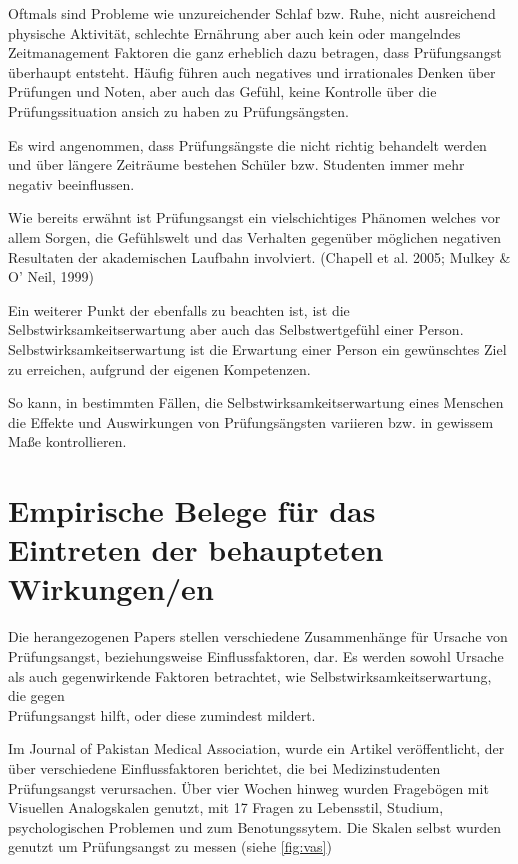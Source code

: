 \documentclass[11pt, a4paper]{article}
\begin{document}
Oftmals sind Probleme wie unzureichender Schlaf bzw. Ruhe, nicht ausreichend physische Aktivität, schlechte Ernährung aber auch kein oder mangelndes Zeitmanagement Faktoren die ganz erheblich dazu betragen, dass Prüfungsangst überhaupt entsteht. Häufig führen auch negatives und irrationales Denken über Prüfungen und Noten, aber auch das Gefühl, keine Kontrolle über die Prüfungssituation ansich zu haben zu Prüfungsängsten. \cite{hashmat2008factors}

Es wird angenommen, dass Prüfungsängste die nicht richtig behandelt werden und über längere Zeiträume bestehen Schüler bzw. Studenten immer mehr negativ beeinflussen. 

Wie bereits erwähnt ist Prüfungsangst ein vielschichtiges Phänomen welches vor allem Sorgen, die Gefühlswelt und das Verhalten gegenüber möglichen negativen Resultaten der akademischen Laufbahn involviert. (Chapell et al. 2005; Mulkey \& O’ Neil, 1999)

Ein weiterer Punkt der ebenfalls zu beachten ist, ist die Selbstwirksamkeitserwartung aber auch das Selbstwertgefühl einer Person. Selbstwirksamkeitserwartung ist die Erwartung einer Person ein gewünschtes Ziel zu erreichen, aufgrund der eigenen Kompetenzen.

So kann, in bestimmten Fällen, die Selbstwirksamkeitserwartung eines Menschen die Effekte und Auswirkungen von Prüfungsängsten variieren bzw. in gewissem Maße kontrollieren. \cite{barrows2013anxiety}

\newpage
\section*{Empirische Belege für das Eintreten der behaupteten Wirkungen/en}

	Die herangezogenen Papers stellen verschiedene Zusammenhänge für Ursache von \\Prüfungsangst, beziehungsweise Einflussfaktoren, dar. Es werden sowohl Ursache als auch gegenwirkende Faktoren betrachtet, wie Selbstwirksamkeitserwartung, die gegen \\Prüfungsangst hilft, oder diese zumindest mildert.

	Im Journal of Pakistan Medical Association, wurde ein Artikel veröffentlicht, der über verschiedene Einflussfaktoren berichtet, die bei Medizinstudenten Prüfungsangst verursachen. Über vier Wochen hinweg wurden Fragebögen mit Visuellen Analogskalen genutzt, mit 17 Fragen zu Lebensstil, Studium, psychologischen Problemen und zum Benotungssytem. Die Skalen selbst wurden genutzt um Prüfungsangst zu messen (siehe \cref{fig:vas}) \cite{hashmat2008factors}
\end{document}
